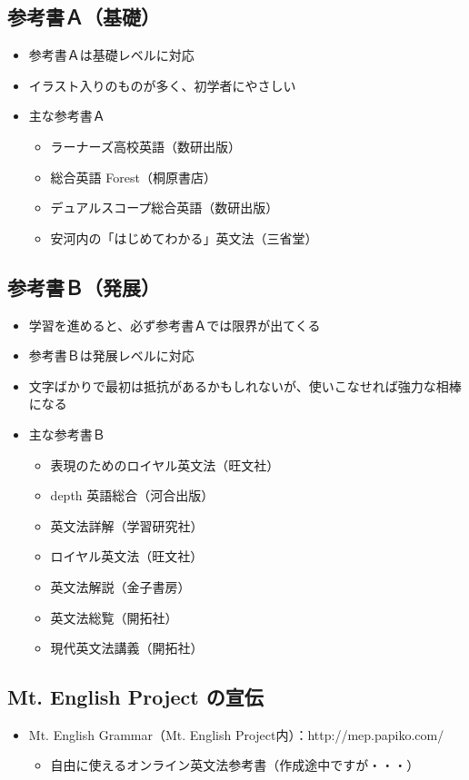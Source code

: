 \documentclass[12pt,titlepage]{jsarticle}
\begin{document}
  \subsection*{参考書Ａ（基礎）}
  \begin{itemize}
   \item 参考書Ａは基礎レベルに対応
   \item イラスト入りのものが多く、初学者にやさしい
   \item 主な参考書Ａ
         \begin{itemize}
          \item ラーナーズ高校英語（数研出版）
          \item 総合英語 Forest（桐原書店）
          \item デュアルスコープ総合英語（数研出版）
          \item 安河内の「はじめてわかる」英文法（三省堂）
         \end{itemize}
  \end{itemize}

  \subsection*{参考書Ｂ（発展）}
  \begin{itemize}
   \item 学習を進めると、必ず参考書Ａでは限界が出てくる
   \item 参考書Ｂは発展レベルに対応
   \item 文字ばかりで最初は抵抗があるかもしれないが、使いこなせれば強力な相棒になる
   \item 主な参考書Ｂ
         \begin{itemize}
          \item 表現のためのロイヤル英文法（旺文社）
          \item depth 英語総合（河合出版）
          \item 英文法詳解（学習研究社）
          \item ロイヤル英文法（旺文社）
          \item 英文法解説（金子書房）
          \item 英文法総覧（開拓社）
          \item 現代英文法講義（開拓社）
         \end{itemize}
  \end{itemize}
  \subsection*{Mt. English Project の宣伝}
  \begin{itemize}
   \item Mt. English Grammar（Mt. English Project内）：http://mep.papiko.com/
         \begin{itemize}
          \item 自由に使えるオンライン英文法参考書（作成途中ですが・・・）
         \end{itemize}
  \end{itemize}
\end{document}

